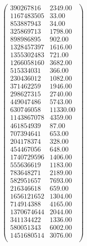         \begin{equation}\label{eq:userdataframe}
            \begin{pmatrix}
              390267816 & 2349.00 \\ 
              1167483505 & 33.00 \\ 
              853887943 & 34.00 \\ 
              325869713 & 1798.00 \\ 
              898986895 & 902.00 \\ 
              1328457397 & 1616.00 \\ 
              1355302483 & 721.00 \\ 
              1266058160 & 3682.00 \\ 
              515334031 & 366.00 \\ 
              230436012 & 1082.00 \\ 
              371462259 & 1946.00 \\ 
              298627315 & 2740.00 \\ 
              449047486 & 5743.00 \\ 
              630746058 & 11330.00 \\ 
              1143867078 & 4359.00 \\ 
              461854939 & 87.00 \\ 
              707394641 & 653.00 \\ 
              204178374 & 328.00 \\ 
              454467056 & 648.00 \\ 
              1740729596 & 1406.00 \\ 
              555636619 & 1183.00 \\ 
              783648271 & 2189.00 \\ 
              582951657 & 7693.00 \\ 
              216346618 & 659.00 \\ 
              1656121652 & 1304.00 \\ 
              714914388 & 4165.00 \\ 
              1370674644 & 2044.00 \\ 
              341134422 & 1336.00 \\ 
              580051343 & 6002.00 \\ 
              1451680514 & 3076.00 \\ 
            \end{pmatrix}
        \end{equation}

